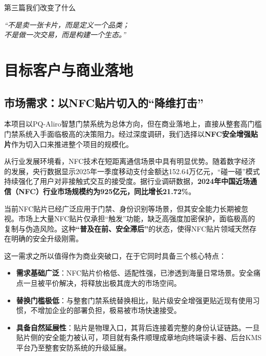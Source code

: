 \cleardoublepage
\thispagestyle{empty} %

\vspace*{6cm} %

\begin{center}
	{\heiti\erhao 第三篇\quad 我们改变了什么} 
	
	\vspace{2cm} %
	
	{\songti\xiaosi \textit{“不是卖一张卡片，而是定义一个品类；\\ [0.5em] 不是做一次交易，而是构建一个生态。”}}
\end{center}

\vfill
\cleardoublepage %

\chapter{目标客户与商业落地}

\section{市场需求：以NFC贴片切入的“降维打击”}

本项目以PQ-Aliro智慧门禁系统为总体方向，但在商业落地上，直接从整套高门槛门禁系统入手面临极高的决策阻力。经过深度调研，我们选择以\textbf{NFC安全增强贴片}作为切入口来推进整个项目的规模化。

从行业发展环境看，NFC技术在短距离通信场景中具有明显优势。随着数字经济的发展，央行数据显示2025年一季度移动支付金额达152.64万亿元，“碰一碰”模式持续强化了用户对非接触式交互的接受度。据行业调研数据，\textbf{2024年中国近场通信（NFC）行业市场规模约为925亿元，同比增长21.72\%}。

当前NFC贴片已经广泛应用于门禁、身份识别等场景，但其安全能力长期被忽视。市场上大量NFC贴片仅承担“触发”功能，缺乏高强度加密保护，面临极高的复制与伪造风险。这种\textbf{“普及在前、安全滞后”}的状态，使得NFC贴片领域天然存在明确的安全升级刚需。

这一需求之所以值得作为商业突破口，在于它同时具备三个核心特点：
\begin{itemize}
	\item \textbf{需求基础广泛}：NFC贴片价格低、适配性强，已渗透到海量日常场景。安全痛点一旦被平价解决，将释放出极其庞大的市场空间。
	\item \textbf{替换门槛极低}：与整套门禁系统替换相比，贴片级安全增强更贴近现有使用习惯，不增加企业的部署负担，极易被市场快速接受。
	\item \textbf{具备自然延展性}：贴片是物理入口，其背后连接着完整的身份认证链路。一旦贴片侧的安全能力被认可，项目就有条件顺理成章地向终端读卡器、后台KMS平台乃至整套安防系统的升级延展。
\end{itemize}

